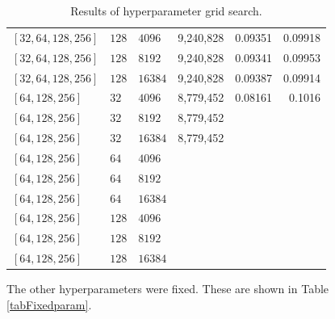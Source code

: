 \begin{table}[H]
\begin{adjustbox}{width=\textwidth}
\begin{tabular}{lll|rrr}
      $[32, 64, 128, 256 ]$& $128$ & $4096$ & 9,240,828 & 0.09351 & 0.09918 \\
      $[32, 64, 128, 256 ]$& $128$ & $8192$ & 9,240,828 & 0.09341 & 0.09953 \\
      $[32, 64, 128, 256 ]$& $128$ & $16384$ & 9,240,828 & 0.09387 & 0.09914 \\[0.5cm]



      $[64, 128, 256 ]$& $32$ & $4096$ & 8,779,452 & 0.08161 & 0.1016 \\
      $[64, 128, 256 ]$& $32$ & $8192$ & 8,779,452 && \\
      $[64, 128, 256 ]$& $32$ & $16384$ & 8,779,452 && \\[0.1cm]

      $[64, 128, 256 ]$& $64$ & $4096$ & && \\
      $[64, 128, 256 ]$& $64$ & $8192$ & && \\
      $[64, 128, 256 ]$& $64$ & $16384$ & && \\[0.1cm]

      $[64, 128, 256 ]$& $128$  & $4096$ & && \\
      $[64, 128, 256 ]$& $128$ & $8192$ & && \\
      $[64, 128, 256 ]$& $128$ & $16384$ & && \\

    \end{tabular}
  \end{adjustbox}
  \caption{Results of hyperparameter grid search.}
  \label{tabHyperparam}
\end{table}

The other hyperparameters were fixed. These are shown in Table
\ref{tabFixedparam}.

